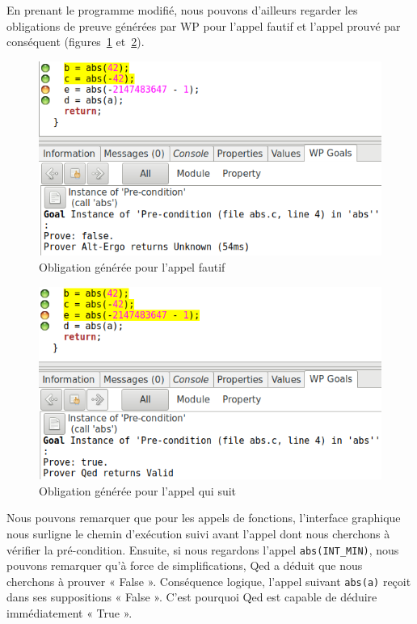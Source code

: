 \documentclass[12pt,francais,]{scrbook}
\begin{document}
En prenant le programme modifié, nous pouvons d'ailleurs regarder les
obligations de preuve générées par WP pour l'appel fautif et l'appel
prouvé par conséquent (figures~\ref{fig:2-1-2-foo-2} et~\ref{fig:2-1-2-foo-3}).

\begin{figure}[htbp]
\centering
\includegraphics[scale=0.5]{2-1-2-foo-2.png}
\caption{Obligation générée pour l'appel fautif}
\label{fig:2-1-2-foo-2}
\end{figure}

\begin{figure}[htbp]
\centering
\includegraphics[scale=0.5]{2-1-2-foo-3.png}
\caption{Obligation générée pour l'appel qui suit}
\label{fig:2-1-2-foo-3}
\end{figure}

Nous pouvons remarquer que pour les appels de fonctions, l'interface
graphique nous surligne le chemin d'exécution suivi avant l'appel dont
nous cherchons à vérifier la pré-condition. Ensuite, si nous regardons
l'appel \texttt{abs(INT\_MIN)}, nous pouvons remarquer qu'à force de
simplifications, Qed a déduit que nous cherchons à prouver « False ».
Conséquence logique, l'appel suivant \texttt{abs(a)} reçoit dans ses
suppositions « False ». C'est pourquoi Qed est capable de déduire
immédiatement « True ».
\end{document}

